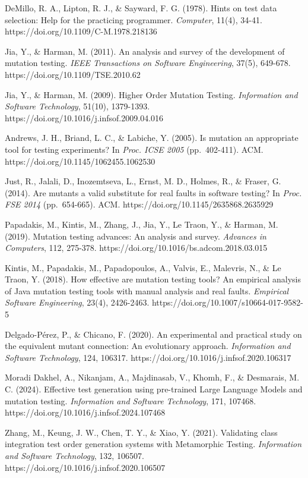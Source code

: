 \documentclass[review,12pt,authoryear]{elsarticle}
\begin{document}
DeMillo, R. A., Lipton, R. J., \& Sayward, F. G. (1978). Hints on test
data selection: Help for the practicing programmer. \emph{Computer},
11(4), 34-41. https://doi.org/10.1109/C-M.1978.218136

Jia, Y., \& Harman, M. (2011). An analysis and survey of the development
of mutation testing. \emph{IEEE Transactions on Software Engineering},
37(5), 649-678. https://doi.org/10.1109/TSE.2010.62

Jia, Y., \& Harman, M. (2009). Higher Order Mutation Testing.
\emph{Information and Software Technology}, 51(10), 1379-1393.
https://doi.org/10.1016/j.infsof.2009.04.016

Andrews, J. H., Briand, L. C., \& Labiche, Y. (2005). Is mutation an
appropriate tool for testing experiments? In \emph{Proc. ICSE 2005}
(pp.~402-411). ACM. https://doi.org/10.1145/1062455.1062530

Just, R., Jalali, D., Inozemtseva, L., Ernst, M. D., Holmes, R., \&
Fraser, G. (2014). Are mutants a valid substitute for real faults in
software testing? In \emph{Proc. FSE 2014} (pp.~654-665). ACM.
https://doi.org/10.1145/2635868.2635929

Papadakis, M., Kintis, M., Zhang, J., Jia, Y., Le Traon, Y., \& Harman,
M. (2019). Mutation testing advances: An analysis and survey.
\emph{Advances in Computers}, 112, 275-378.
https://doi.org/10.1016/bs.adcom.2018.03.015

Kintis, M., Papadakis, M., Papadopoulos, A., Valvis, E., Malevris, N.,
\& Le Traon, Y. (2018). How effective are mutation testing tools? An
empirical analysis of Java mutation testing tools with manual analysis
and real faults. \emph{Empirical Software Engineering}, 23(4),
2426-2463. https://doi.org/10.1007/s10664-017-9582-5

Delgado-Pérez, P., \& Chicano, F. (2020). An experimental and practical
study on the equivalent mutant connection: An evolutionary approach.
\emph{Information and Software Technology}, 124, 106317.
https://doi.org/10.1016/j.infsof.2020.106317

Moradi Dakhel, A., Nikanjam, A., Majdinasab, V., Khomh, F., \&
Desmarais, M. C. (2024). Effective test generation using pre-trained
Large Language Models and mutation testing. \emph{Information and
Software Technology}, 171, 107468.
https://doi.org/10.1016/j.infsof.2024.107468

Zhang, M., Keung, J. W., Chen, T. Y., \& Xiao, Y. (2021). Validating
class integration test order generation systems with Metamorphic
Testing. \emph{Information and Software Technology}, 132, 106507.
https://doi.org/10.1016/j.infsof.2020.106507
\end{document}
